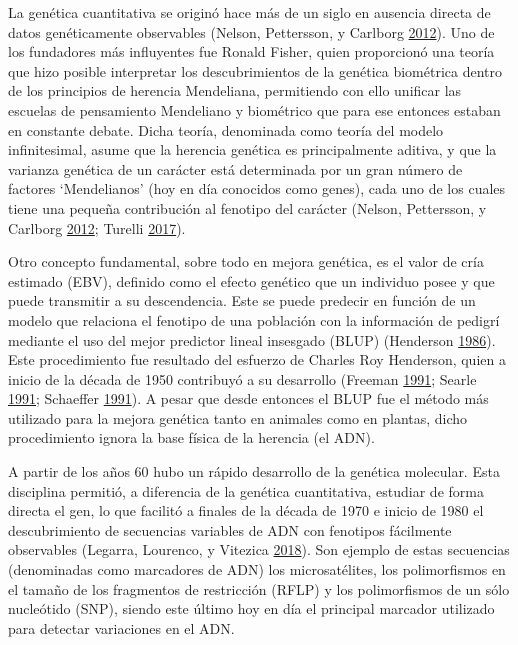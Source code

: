 \documentclass[11pt,spanish,a4paper,oneside,]{book} %
\begin{document}
\hspace*{1em}

La genética cuantitativa se originó hace más de un siglo en ausencia directa de datos genéticamente observables (Nelson, Pettersson, y Carlborg \protect\hyperlink{ref-cite:2}{2012}). Uno de los fundadores más influyentes fue Ronald Fisher, quien proporcionó una teoría que hizo posible interpretar los descubrimientos de la genética biométrica dentro de los principios de herencia Mendeliana, permitiendo con ello unificar las escuelas de pensamiento Mendeliano y biométrico que para ese entonces estaban en constante debate. Dicha teoría, denominada como teoría del modelo infinitesimal, asume que la herencia genética es principalmente aditiva, y que la varianza genética de un carácter está determinada por un gran número de factores `Mendelianos' (hoy en día conocidos como genes), cada uno de los cuales tiene una pequeña contribución al fenotipo del carácter (Nelson, Pettersson, y Carlborg \protect\hyperlink{ref-cite:2}{2012}; Turelli \protect\hyperlink{ref-cite:9}{2017}).

Otro concepto fundamental, sobre todo en mejora genética, es el valor de cría estimado (EBV), definido como el efecto genético que un individuo posee y que puede transmitir a su descendencia. Este se puede predecir en función de un modelo que relaciona el fenotipo de una población con la información de pedigrí mediante el uso del mejor predictor lineal insesgado (BLUP) (Henderson \protect\hyperlink{ref-cite:67}{1986}). Este procedimiento fue resultado del esfuerzo de Charles Roy Henderson, quien a inicio de la década de 1950 contribuyó a su desarrollo (Freeman \protect\hyperlink{ref-cite:28}{1991}; Searle \protect\hyperlink{ref-cite:29}{1991}; Schaeffer \protect\hyperlink{ref-cite:27}{1991}). A pesar que desde entonces el BLUP fue el método más utilizado para la mejora genética tanto en animales como en plantas, dicho procedimiento ignora la base física de la herencia (el ADN).

A partir de los años 60 hubo un rápido desarrollo de la genética molecular. Esta disciplina permitió, a diferencia de la genética cuantitativa, estudiar de forma directa el gen, lo que facilitó a finales de la década de 1970 e inicio de 1980 el descubrimiento de secuencias variables de ADN con fenotipos fácilmente observables (Legarra, Lourenco, y Vitezica \protect\hyperlink{ref-cite:30}{2018}). Son ejemplo de estas secuencias (denominadas como marcadores de ADN) los microsatélites, los polimorfismos en el tamaño de los fragmentos de restricción (RFLP) y los polimorfismos de un sólo nucleótido (SNP), siendo este último hoy en día el principal marcador utilizado para detectar variaciones en el ADN.
\end{document}

